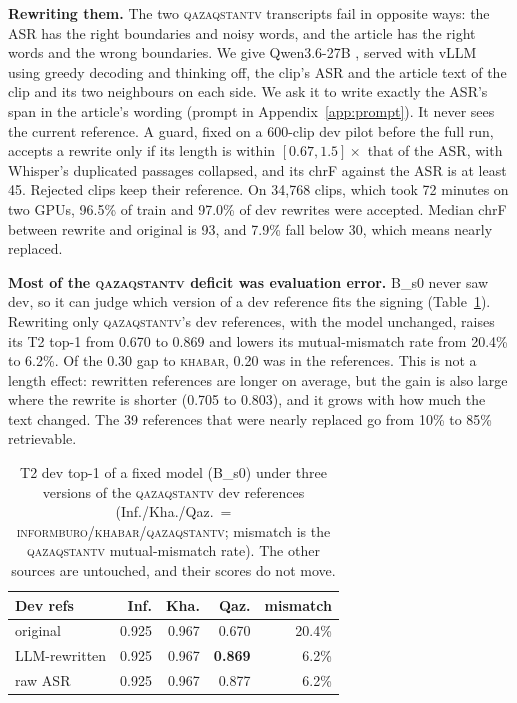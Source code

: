 \documentclass[11pt,twocolumn,a4paper]{article}
\newcommand{\src}[1]{\textsc{#1}}
\newcommand{\ib}{\src{informburo}}
\newcommand{\kh}{\src{khabar}}
\newcommand{\qz}{\src{qazaqstantv}}
\renewcommand{\paragraph}[1]{\par\smallskip\noindent\textbf{#1}\hspace{0.5em}}
\begin{document}
\paragraph{Rewriting them.}
The two \qz{} transcripts fail in opposite ways: the ASR has the right boundaries and noisy words, and the article has the right words and the wrong boundaries. We give Qwen3.6-27B \citep{qwen36}, served with vLLM \citep{kwon2023vllm} using greedy decoding and thinking off, the clip's ASR and the article text of the clip and its two neighbours on each side. We ask it to write exactly the ASR's span in the article's wording (prompt in Appendix~\ref{app:prompt}). It never sees the current reference. A guard, fixed on a 600-clip dev pilot before the full run, accepts a rewrite only if its length is within $[0.67, 1.5]\times$ that of the ASR, with Whisper's duplicated passages collapsed, and its chrF against the ASR is at least 45. Rejected clips keep their reference. On 34{,}768 clips, which took 72 minutes on two GPUs, 96.5\% of train and 97.0\% of dev rewrites were accepted. Median chrF between rewrite and original is 93, and 7.9\% fall below 30, which means nearly replaced.

\paragraph{Most of the \qz{} deficit was evaluation error.}
B\_s0 never saw dev, so it can judge which version of a dev reference fits the signing (Table~\ref{tab:precheck}). Rewriting only \qz's dev references, with the model unchanged, raises its T2 top-1 from 0.670 to 0.869 and lowers its mutual-mismatch rate from 20.4\% to 6.2\%. Of the 0.30 gap to \kh, 0.20 was in the references. This is not a length effect: rewritten references are longer on average, but the gain is also large where the rewrite is shorter (0.705 to 0.803), and it grows with how much the text changed. The 39 references that were nearly replaced go from 10\% to 85\% retrievable.

\begin{table}[t]
\centering\small
\setlength{\tabcolsep}{4pt}
\begin{tabular}{lrrrr}
\toprule
Dev refs & Inf. & Kha. & Qaz. & mismatch \\
\midrule
original & 0.925 & 0.967 & 0.670 & 20.4\% \\
LLM-rewritten & 0.925 & 0.967 & \textbf{0.869} & 6.2\% \\
raw ASR & 0.925 & 0.967 & 0.877 & 6.2\% \\
\bottomrule
\end{tabular}
\caption{T2 dev top-1 of a fixed model (B\_s0) under three versions of the \qz{} dev references (Inf./Kha./Qaz.\ = \ib/\kh/\qz; mismatch is the \qz{} mutual-mismatch rate). The other sources are untouched, and their scores do not move.}
\label{tab:precheck}
\end{table}
\end{document}
